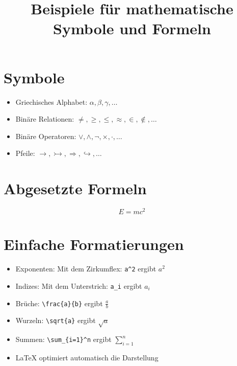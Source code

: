 \documentclass{scrartcl}
\title{Beispiele für mathematische Symbole und Formeln}
\begin{document}
\maketitle	
\section{Symbole}

\begin{itemize}
\item Griechisches Alphabet: $\alpha, \beta, \gamma, \dots$
\item Binäre Relationen: $\neq, \geq, \leq, \approx, \in, \notin, \dots$
\item Binäre Operatoren: $\vee, \wedge, \neg, \times, \cdot, \dots$
\item Pfeile: $\rightarrow, \rightarrowtail, \Rightarrow, \hookrightarrow, \dots$
\end{itemize}

\section{Abgesetzte Formeln}

\begin{equation}\label{eqn:einstein}
 E = mc^2
\end{equation}

\section{Einfache Formatierungen}

\begin{itemize}
\item Exponenten: Mit dem Zirkumflex: \texttt{a\^{}2} ergibt \( a^2 \)
\vspace{5mm}
\item Indizes: Mit dem Unterstrich: \texttt{a\_i} ergibt \( a_i \)
\vspace{5mm}
\item Brüche: \texttt{\textbackslash frac\{a\}\{b\}} ergibt \(\frac{a}{b}\)
\vspace{5mm}
\item Wurzeln: \texttt{\textbackslash sqrt\{a\}} ergibt \(\sqrt{a}\)
\vspace{5mm}
\item Summen: \texttt{\textbackslash sum\_\{i=1\}\^{}n} ergibt \(\sum_{i=1}^{n}\)
\vspace{5mm}
\item LaTeX optimiert automatisch die Darstellung%
\end{itemize}
\end{document}
